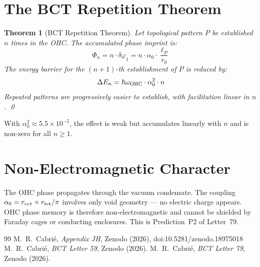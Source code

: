 \documentclass[aps,prl,twocolumn,showpacs,superscriptaddress]{revtex4-2}
\newtheorem{theorem}{Theorem}
\begin{document}
\section{The BCT Repetition Theorem}

\begin{theorem}[BCT Repetition Theorem]
Let topological pattern $P$ be established $n$ times in the OHC. 
The accumulated phase imprint is:
\begin{equation}
    \Phi_n = n \cdot \delta\varphi_1 = n \cdot \alpha_0 \cdot 
    \frac{\ell_P}{r_0}
\end{equation}
The energy barrier for the $(n+1)$-th establishment of $P$ is 
reduced by:
\begin{equation}
    \Delta E_n = \hbar\omega_{\rm OHC} \cdot \alpha_0^2 \cdot n
\end{equation}
Repeated patterns are progressively easier to establish, with 
facilitation linear in $n$. \qed
\end{theorem}

With $\alpha_0^2 \approx 5.5\times10^{-5}$, the effect is weak but 
accumulates linearly with $n$ and is non-zero for all $n\geq1$.

\section{Non-Electromagnetic Character}

The OHC phase propagates through the vacuum condensate. The coupling 
$\alpha_0 = r_{\rm oct}\times r_{\rm tet}/\pi$ involves only void 
geometry --- no electric charge appears. OHC phase memory is therefore 
non-electromagnetic and cannot be shielded by Faraday cages or 
conducting enclosures. This is Prediction~P2 of Letter~79.

\begin{thebibliography}{99}
 M.~R.~Cabri\'e, \textit{Appendix JH}, Zenodo (2026),
doi:10.5281/zenodo.18975018
 M.~R.~Cabri\'e, \textit{BCT Letter 59}, Zenodo (2026).
 M.~R.~Cabri\'e, \textit{BCT Letter 79}, Zenodo (2026).
\end{thebibliography}
\end{document}

